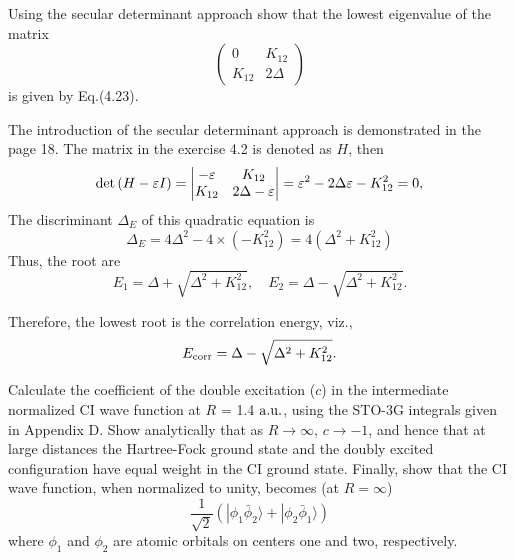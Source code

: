 \documentclass[a4paper]{book}
\renewcommand\det[1]{{\rm det}\left(#1\right)}
\newcommand{\corr}{{\rm corr}}
\newcommand{\au}{{\rm a.u.}}
\begin{document}
	\begin{exercise}
	Using the secular determinant approach show that the lowest eigenvalue of the matrix
	\[
		\begin{pmatrix}
			0 & K_{12} \\ K_{12} & 2\Delta
		\end{pmatrix}
	\]
	is given by Eq.(4.23).
	\end{exercise}
	
	\begin{solution}
	
	The introduction of the secular determinant approach is demonstrated in the page 18. The matrix in the exercise 4.2 is denoted as $H$, then
	\[
		\det{H - \varepsilon I} = \begin{vmatrix}
		- \varepsilon & K_{12} \\ K_{12} & 2\Delta - \varepsilon
		\end{vmatrix} = \varepsilon^2 - 2 \Delta \varepsilon -K^2_{12} = 0 ,
	\]	
	The discriminant $\Delta_E$ of this quadratic equation is
	\[
		\Delta_E = 4 \Delta^2 - 4 \times ( -K^2_{12} ) = 4( \Delta^2 + K^2_{12} )
	\]	
	Thus, the root are
	\[
		E_1 = \Delta + \sqrt{ \Delta^2 + K^2_{12} }, \quad E_2 = \Delta - \sqrt{ \Delta^2 + K^2_{12} }.
	\]	
	
	Therefore, the lowest root is the correlation energy, viz.,
	\begin{equation}
		E_\corr = \Delta - \sqrt{ \Delta^2 + K^2_{12} }.
	\end{equation}
	
	\end{solution}
	
	\begin{exercise}
	Calculate the coefficient of the double excitation ($c$) in the intermediate normalized CI wave function at $R$ = 1.4 $\au$, using the STO-3G integrals given in Appendix D. Show analytically that as $R \rightarrow \infty$, $c \rightarrow -1$, and hence that at large distances the Hartree-Fock ground state and the doubly excited configuration have equal weight in the CI ground state. Finally, show that the CI wave function, when normalized to unity, becomes (at $R=\infty$)
	\[
		\frac{1}{\sqrt{2}} \left( | \phi_1 \bar{\phi}_2 \rangle + | \phi_2 \bar{\phi}_1 \rangle \right)
	\]
	where $\phi_1$ and $\phi_2$ are atomic orbitals on centers one and two, respectively.
	\end{exercise}
	
\end{document}
